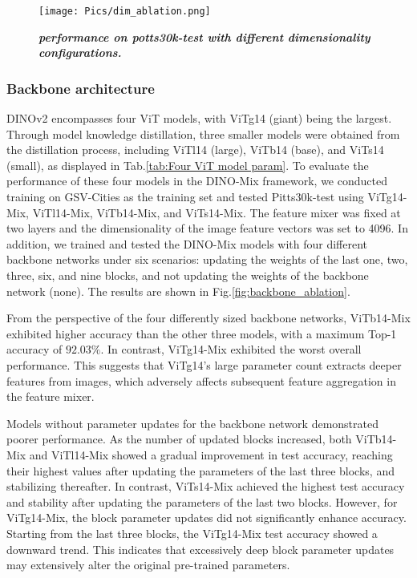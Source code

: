     \begin{figure}[!t]
    \renewcommand{\thefigure}{6} 
        \centering
        \texttt{[image: Pics/dim\_ablation.png]}
        \vspace{-1em}
        \caption{\emph{\textbf{performance on potts30k-test with different dimensionality configurations.}}}
        \label{fig:dim_ablation}
    \end{figure}

   \subsubsection{Backbone architecture} 

DINOv2 encompasses four ViT models, with ViTg14 (giant) being the largest. Through model knowledge distillation, three smaller models were obtained from the distillation process, including ViTl14 (large), ViTb14 (base), and ViTs14 (small), as displayed in Tab.\ref{tab:Four ViT model param}. To evaluate the performance of these four models in the DINO-Mix framework, we conducted training on GSV-Cities as the training set and tested Pitts30k-test using ViTg14-Mix, ViTl14-Mix, ViTb14-Mix, and ViTs14-Mix. The feature mixer was fixed at two layers and the dimensionality of the image feature vectors was set to 4096. In addition, we trained and tested the DINO-Mix models with four different backbone networks under six scenarios: updating the weights of the last one, two, three, six, and nine blocks, and not updating the weights of the backbone network (none). The results are shown in Fig.\ref{fig:backbone_ablation}.

From the perspective of the four differently sized backbone networks, ViTb14-Mix exhibited higher accuracy than the other three models, with a maximum Top-1 accuracy of $92.03\%$. In contrast, ViTg14-Mix exhibited the worst overall performance. This suggests that ViTg14’s large parameter count extracts deeper features from images, which adversely affects subsequent feature aggregation in the feature mixer.

Models without parameter updates for the backbone network demonstrated poorer performance. As the number of updated blocks increased, both ViTb14-Mix and ViTl14-Mix showed a gradual improvement in test accuracy, reaching their highest values after updating the parameters of the last three blocks, and stabilizing thereafter. In contrast, ViTs14-Mix achieved the highest test accuracy and stability after updating the parameters of the last two blocks. However, for ViTg14-Mix, the block parameter updates did not significantly enhance accuracy. Starting from the last three blocks, the ViTg14-Mix test accuracy showed a downward trend. This indicates that excessively deep block parameter updates may extensively alter the original pre-trained parameters.

